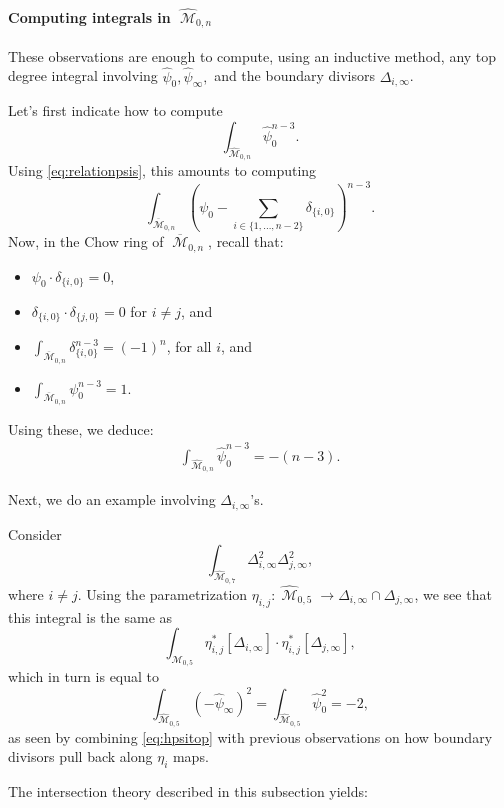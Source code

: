 \documentclass[12pt,reqno]{amsart}
\DeclareMathOperator{\M}{\mathcal{M}}
\renewcommand{\to}{{\longrightarrow}}
\numberwithin{equation}{section}
\newcommand{\hpsi}{\widehat{\psi}}
\newcommand{\hM}{\widehat{\M}}
\renewcommand {\o}[1]{\overline{#1}}
\begin{document}
\paragraph{Computing integrals in $\hM_{0,n}$}

These observations are enough to compute, using an inductive method,
any top degree integral involving $\hpsi_{0}, \hpsi_{\infty},$ and the
boundary divisors $\Delta_{i, \infty}$.

\begin{example}
  \label{ex:toppsi}
  Let's first indicate how to
  compute $$\int_{\hM_{0,n}}\hpsi_{0}^{n-3}.$$ Using
  \eqref{eq:relationpsis}, this amounts to computing
  $$\int_{\o{\M}_{0,n}} \left(\psi_{0} - \sum_{i \in \{1, \dots, n-2\}} \delta_{\{i,0\}}\right)^{n-3}.$$
  Now, in the Chow ring of $\o{\M}_{0,n}$, recall that:
  \begin{itemize}
  \item $\psi_{0} \cdot \delta_{\{i,0\}} = 0$, 
  \item $\delta_{\{i,0\}} \cdot \delta_{\{j,0\}} = 0$ for $i \neq j$,
    and
  \item $\int_{\o{\M}_{0,n}}\delta_{\{i,0\}}^{n-3} = (-1)^{n}$, for
    all $i$, and
  \item $\int_{\o{\M}_{0,n}} \psi_{0}^{n-3} = 1$.
  \end{itemize}

  Using these, we deduce:
  \begin{align}
    \label{eq:hpsitop}
    \int_{\hM_{0,n}}\hpsi_{0}^{n-3} = -(n-3). 
  \end{align}
\end{example}

Next, we do an example involving $\Delta_{i, \infty}$'s.

\begin{example}
  Consider
  $$\int_{\hM_{0,7}} \Delta_{i, \infty}^{2}\Delta_{j, \infty}^{2},$$
  where $i \neq j$.  Using the parametrization
  $\eta_{i,j} : \hM_{0,5} \to \Delta_{i,\infty} \cap
  \Delta_{j,\infty}$, we see that this integral is the same as
  $$\int_{\hM_{0,5}}\eta_{i,j}^{*}[\Delta_{i, \infty}] \cdot \eta_{i,j}^{*}[\Delta_{j, \infty}],$$
  which in turn is equal to
  $$\int_{\hM_{0,5}}(-\hpsi_{\infty})^{2} = \int_{\hM_{0,5}}\hpsi_{0}^{2} = -2,$$
  as seen by combining \eqref{eq:hpsitop} with previous observations
  on how boundary divisors pull back along $\eta_{i}$ maps.
\end{example}

The intersection theory described in this subsection yields:
\end{document}
